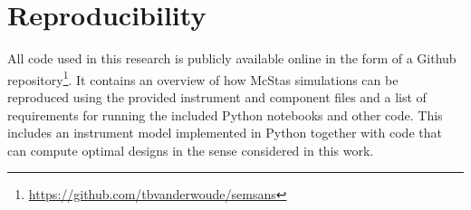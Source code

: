 \section{Reproducibility}
All code used in this research is publicly available online in the form of a Github repository\footnote{\url{https://github.com/tbvanderwoude/semsans}}. It contains an overview of how McStas simulations can be reproduced using the provided instrument and component files and a list of requirements for running the included Python notebooks and other code. This includes an instrument model implemented in Python together with code that can compute optimal designs in the sense considered in this work.